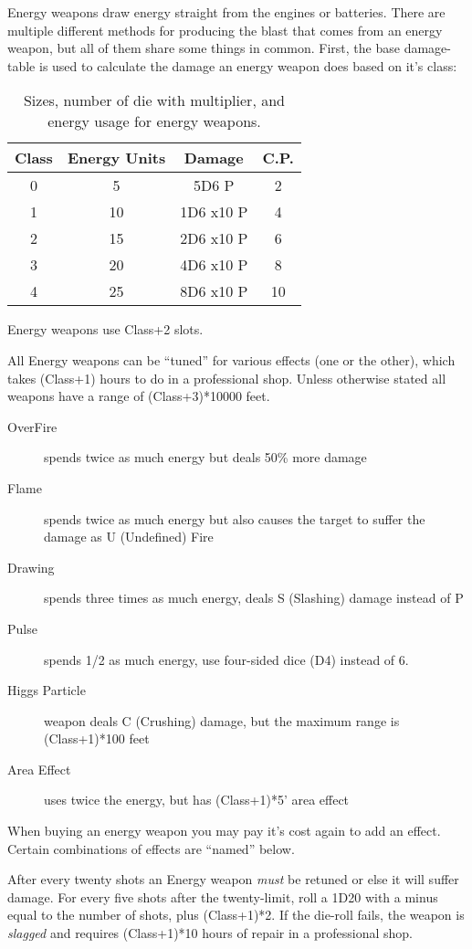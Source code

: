 Energy weapons draw energy straight from the engines or batteries. There
are multiple different methods for producing the blast that comes from
an energy weapon, but all of them share some things in common. First, the
base damage-table is used to calculate the damage an energy weapon
does based on it's class:

\begin{table}[htb]
\begin{center}
\begin{tabular}{c|c|c|c}
\textbf{Class} & \textbf{Energy Units} & \textbf{Damage} & \textbf{C.P.} \\ \hline \hline
0 & 5 & 5D6 P & 2 \\ \hline
1 & 10 & 1D6 x10 P & 4 \\ \hline
2 & 15 & 2D6 x10 P & 6 \\ \hline
3 & 20 & 4D6 x10 P & 8 \\ \hline
4 & 25 & 8D6 x10 P & 10 \\ \hline
\end{tabular}
\caption{Sizes, number of die with multiplier, and energy usage for energy weapons.}
\end{center}
\end{table}

Energy weapons use Class+2 slots.

All Energy weapons can be ``tuned'' for various effects (one
or the other), which takes (Class+1) hours to do in a professional shop. Unless
otherwise stated all weapons have a range of (Class+3)*10000 feet.

\begin{description}
\item[OverFire] spends twice as much energy but deals 50\% more damage
\item[Flame] spends twice as much energy but also causes the target to suffer
the damage as U (Undefined) Fire
\item[Drawing] spends three times as much energy, deals S (Slashing) damage instead of P
\item[Pulse] spends 1/2 as much energy, use four-sided dice (D4) instead of 6.
\item[Higgs Particle] weapon deals C (Crushing) damage, but the maximum range is
(Class+1)*100 feet
\item[Area Effect] uses twice the energy, but has (Class+1)*5' area effect
\end{description}

When buying an energy weapon you may pay it's cost again to add an effect. Certain
combinations of effects are ``named'' below.

After every twenty shots an Energy weapon \emph{must} be retuned or else
it will suffer damage. For every five shots after the twenty-limit, roll
a 1D20 with a minus equal to the number of shots, plus (Class+1)*2. If the
die-roll fails, the weapon is \emph{slagged} and requires (Class+1)*10 hours
of repair in a professional shop.
